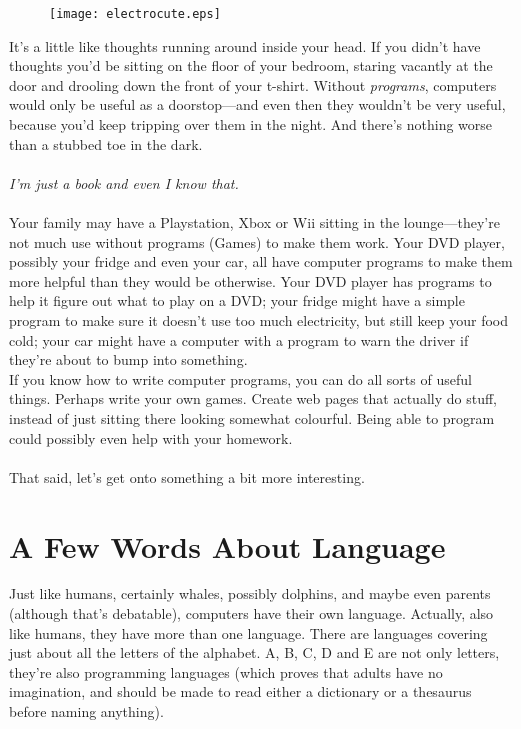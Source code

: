 \begin{figure}
  \begin{center}
\texttt{[image: electrocute.eps]}
  \end{center}
\end{figure}

It's a little like thoughts running around inside your head. If you didn't have thoughts you'd be sitting on the floor of your bedroom, staring vacantly at the door and drooling down the front of your t-shirt. Without \emph{programs}, computers would only be useful as a doorstop---and even then they wouldn't be very useful, because you'd keep tripping over them in the night.  And there's nothing worse than a stubbed toe in the dark.
\\
\\
\emph{I'm just a book and even I know that.}
\\
\\
Your family may have a Playstation, Xbox or Wii sitting in the lounge---they're not much use without programs (Games) to make them work.  Your DVD player, possibly your fridge and even your car, all have computer programs to make them more helpful than they would be otherwise.  Your DVD player has programs to help it figure out what to play on a DVD; your fridge might have a simple program to make sure it doesn't use too much electricity, but still keep your food cold; your car might have a computer with a program to warn the driver if they're about to bump into something.\\
If you know how to write computer programs, you can do all sorts of useful things. Perhaps write your own games. Create web pages that actually do stuff, instead of just sitting there looking somewhat colourful.  Being able to program could possibly even help with your homework.\\
\\
That said, let's get onto something a bit more interesting.

\section{A Few Words About Language}

Just like humans, certainly whales, possibly dolphins, and maybe even parents (although that's debatable), computers have their own language.  Actually, also like humans, they have more than one language.  There are languages covering just about all the letters of the alphabet.  A, B, C, D and E are not only letters, they're also programming languages (which proves that adults have no imagination, and should be made to read either a dictionary or a thesaurus before naming anything).

